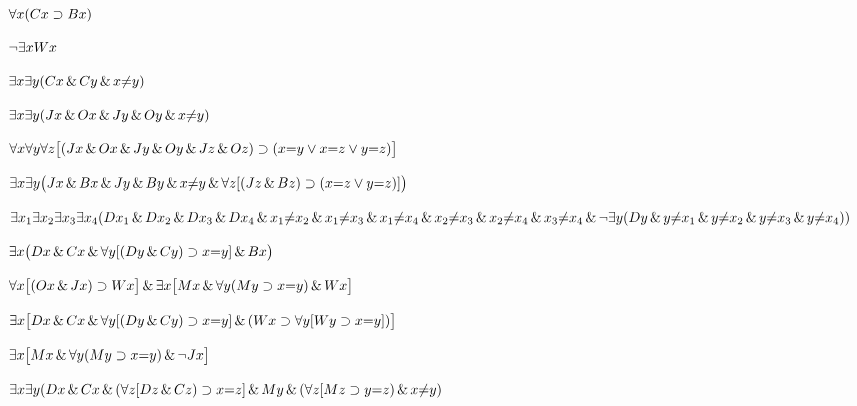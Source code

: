 \begin{earg}
\item %
$\forall x(Cx \supset Bx)$
\item %
$\neg\exists x Wx$
\item %
$\exists x \exists y(Cx \,\&\, Cy \,\&\, x{\neq} y)$
\item %
$\exists x \exists y(Jx \,\&\, Ox \,\&\, Jy \,\&\, Oy \,\&\, x{\neq} y)$
\item %
$\forall x\forall y\forall z\bigl[(Jx \,\&\, Ox \,\&\, Jy \,\&\, Oy \,\&\, Jz \,\&\, Oz)\supset(x{=}y \vee x{=}z \vee y{=}z)\bigr]$
\item %
$\exists x\exists y\bigl(Jx \,\&\, Bx \,\&\, Jy \,\&\, By \,\&\, x {\neq} y\,\&\, \forall z[(Jz \,\&\, Bz) \supset (x{=}z \vee y{=}z)]\bigr)$
\item %
$\exists x_1\exists x_2\exists x_3\exists x_4 (Dx_1 \,\&\, Dx_2 \,\&\, Dx_3 \,\&\, Dx_4 \,\&\, x_1 {\neq} x_2 \,\&\, x_1 {\neq} x_3 \,\&\, x_1 {\neq} x_4 \,\&\, x_2 {\neq} x_3 \,\&\, x_2 {\neq} x_4 \,\&\, x_3 {\neq} x_4 \\  \,\&\, \neg\exists y(Dy \,\&\, y{\neq} x_1 \,\&\, y{\neq}x_2 \,\&\, y{\neq} x_3 \,\&\, y{\neq} x_4))$
\item %
$\exists x\bigl(Dx \,\&\, Cx \,\&\, \forall y[(Dy\,\&\, Cy) \supset x{=}y] \,\&\, Bx\bigr)$
\item %
$\forall x\bigl[(Ox \,\&\, Jx) \supset Wx\bigr] \,\&\, \exists x\bigl[Mx \,\&\, \forall y(My \supset x{=}y) \,\&\, Wx\bigr]$
\item %
$\exists x \bigl[Dx \,\&\, Cx \,\&\, \forall y[(Dy\,\&\, Cy) \supset x{=}y] \,\&\, (Wx \supset \forall y [Wy \supset x{=}y])\bigr]$
\item %
$\exists x\bigl[Mx \,\&\, \forall y(My \supset x{=}y) \,\&\, \neg Jx\bigr]$
\item %
$\exists x \exists y (Dx \,\&\, Cx \,\&\, (\forall z[Dz \,\&\, Cz) \supset x{=}z] \,\&\, My \,\&\, (\forall z [Mz \supset y{=}z) \,\&\, x{\neq}y)$
\end{earg}




